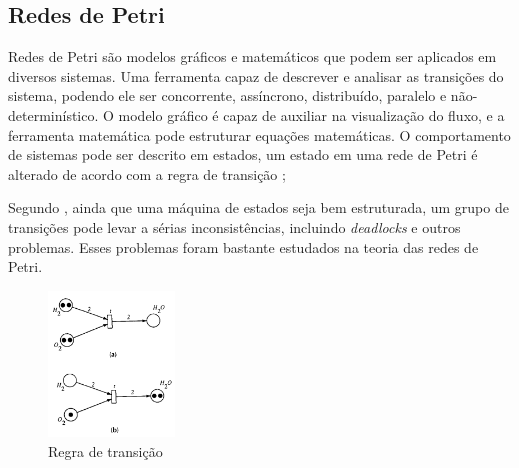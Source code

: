 

\subsection{Redes de Petri}

Redes de Petri são modelos gráficos e matemáticos que podem ser aplicados em diversos sistemas. Uma ferramenta capaz de descrever e analisar as transições do sistema, podendo ele ser concorrente, assíncrono, distribuído, paralelo e não-determinístico. O modelo gráfico é capaz de auxiliar na visualização do fluxo, e a ferramenta matemática pode estruturar equações matemáticas. O comportamento de sistemas pode ser descrito em estados, um estado em uma rede de Petri é alterado de acordo com a regra de transição \cite{murata:1989};

Segundo , ainda que uma máquina de estados seja bem estruturada, um grupo de transições pode levar a sérias inconsistências, incluindo \textit{deadlocks} e outros problemas. Esses problemas foram bastante estudados na teoria das redes de Petri. 

 \begin{figure}[H]
	\centering
    	\caption{\label{fig:petri}Regra de transição}
		\includegraphics[width = 0.3\textwidth]	{resources/petri}
\end{figure}



